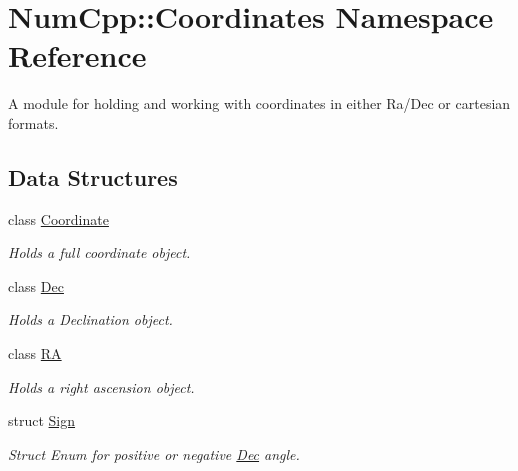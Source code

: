 \hypertarget{namespace_num_cpp_1_1_coordinates}{}\section{Num\+Cpp\+:\+:Coordinates Namespace Reference}
\label{namespace_num_cpp_1_1_coordinates}


A module for holding and working with coordinates in either Ra/\+Dec or cartesian formats.  


\subsection*{Data Structures}
\begin{DoxyCompactItemize}
\item 
class \mbox{\hyperlink{class_num_cpp_1_1_coordinates_1_1_coordinate}{Coordinate}}
\begin{DoxyCompactList}\small\item\em Holds a full coordinate object. \end{DoxyCompactList}\item 
class \mbox{\hyperlink{class_num_cpp_1_1_coordinates_1_1_dec}{Dec}}
\begin{DoxyCompactList}\small\item\em Holds a Declination object. \end{DoxyCompactList}\item 
class \mbox{\hyperlink{class_num_cpp_1_1_coordinates_1_1_r_a}{RA}}
\begin{DoxyCompactList}\small\item\em Holds a right ascension object. \end{DoxyCompactList}\item 
struct \mbox{\hyperlink{struct_num_cpp_1_1_coordinates_1_1_sign}{Sign}}
\begin{DoxyCompactList}\small\item\em Struct Enum for positive or negative \mbox{\hyperlink{class_num_cpp_1_1_coordinates_1_1_dec}{Dec}} angle. \end{DoxyCompactList}\end{DoxyCompactItemize}
